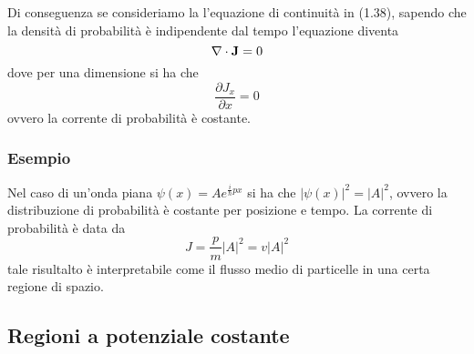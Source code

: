  \noindent Di conseguenza se consideriamo la l'equazione di continuit\`a in (1.38), sapendo che la densit\`a di probabilit\`a \`e indipendente dal tempo l'equazione diventa 
 \begin{equation*}
 	\nabla  \cdot \bold{J} = 0
 \end{equation*}
 dove per una dimensione si ha che 
 \begin{equation*}
 	\frac{\partial J_x}{\partial x} = 0
 \end{equation*}
 ovvero la corrente di probabilit\`a \`e costante.
 
 \subsubsection{Esempio}
 
 Nel caso di un'onda piana $\psi (x) = A e^{\frac{i}{\hbar}px}$ si ha che $|\psi(x)|^2 = |A|^2 $, ovvero la distribuzione di probabilit\`a \`e costante per posizione e tempo. La corrente di probabilit\`a \`e data da 
 \begin{equation*}
 	J = \frac{p}{m}|A|^2 = v|A|^2
 \end{equation*}
 tale risultalto \`e interpretabile come il flusso medio di particelle in una certa regione di spazio.
 
 \subsection{Regioni a potenziale costante}
 
